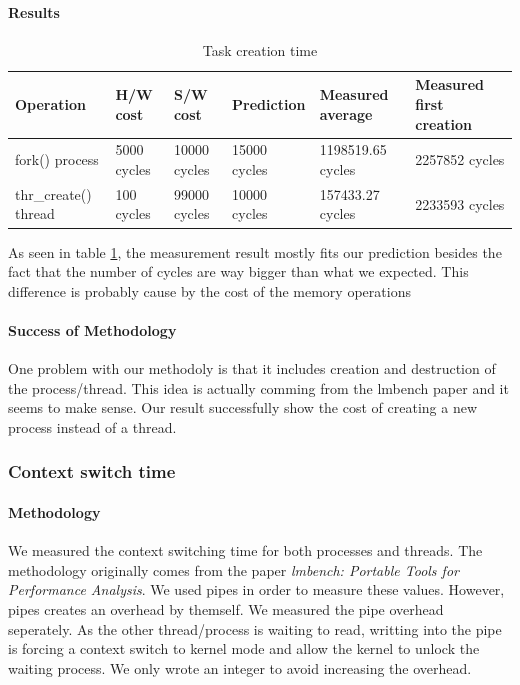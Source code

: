 \paragraph{Results}
\begin{table}[h]
\begin{center}
\begin{tabular}{| l | l | l | l | l | l |}
\hline
Operation & H/W cost & S/W cost & Prediction & Measured average & Measured first creation \\
\hline
fork() process 		& 5000 cycles & 10000 cycles 	& 15000 cycles& 1198519.65 cycles & 2257852 cycles\\ \hline
thr\_create() thread 	& 100 cycles & 99000 cycles	& 10000 cycles &
157433.27 cycles & 2233593 cycles\\ \hline
\end{tabular}
\end{center}
\caption{Task creation time\label{tab:task-creation}}

\end{table}

As seen in table \ref{tab:task-creation}, the measurement result mostly fits our prediction besides the fact that the number of cycles are way bigger than what we expected.
This difference is probably cause by the cost of the memory operations

\paragraph{Success of Methodology}
One problem with our methodoly is that it includes creation and destruction of
the process/thread.
This idea is actually comming from the lmbench paper and it seems to make sense.
Our result successfully show the cost of creating a new process instead of a
thread.


\subsubsection{Context switch time}
\paragraph{Methodology}

We measured the context switching time for both processes and threads.
The methodology originally comes from the paper \emph{lmbench: Portable Tools for Performance
Analysis}.
We used pipes in order to measure these values.
However, pipes creates an overhead by themself.
We measured the pipe overhead seperately.
As the other thread/process is waiting to read, writting into the pipe is
forcing a context switch to kernel mode and allow the kernel to unlock the
waiting process.
We only wrote an integer to avoid increasing the overhead.

